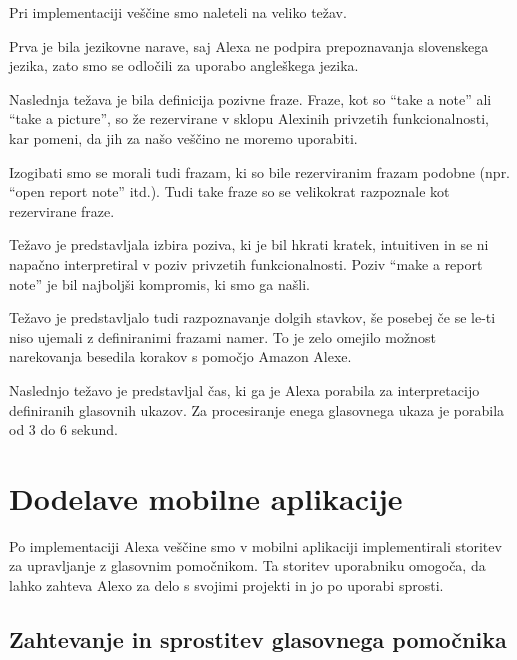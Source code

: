 \documentclass[a4paper, 12pt]{book}
\begin{document}
Pri implementaciji veščine smo naleteli na veliko težav.

Prva je bila jezikovne narave, saj Alexa ne podpira prepoznavanja slovenskega jezika, zato smo se odločili za uporabo angleškega jezika.

Naslednja težava je bila definicija pozivne fraze.
Fraze, kot so \enquote{take a note} ali \enquote{take a picture}, so že rezervirane v sklopu Alexinih privzetih funkcionalnosti, kar pomeni, da jih za našo veščino ne moremo uporabiti.

Izogibati smo se morali tudi frazam, ki so bile rezerviranim frazam podobne (npr. \enquote{open report note} itd.).
Tudi take fraze so se velikokrat razpoznale kot rezervirane fraze.

Težavo je predstavljala izbira poziva, ki je bil hkrati kratek, intuitiven in se ni napačno interpretiral v poziv privzetih funkcionalnosti.
Poziv \enquote{make a report note} je bil najboljši kompromis, ki smo ga našli.

Težavo je predstavljalo tudi razpoznavanje dolgih stavkov, še posebej če se le-ti niso ujemali z definiranimi frazami namer.
To je zelo omejilo možnost narekovanja besedila korakov s pomočjo Amazon Alexe.

Naslednjo težavo je predstavljal čas, ki ga je Alexa porabila za interpretacijo definiranih glasovnih ukazov.
Za procesiranje enega glasovnega ukaza je porabila od 3 do 6 sekund.












\section{Dodelave mobilne aplikacije}

Po implementaciji Alexa veščine smo v mobilni aplikaciji implementirali storitev za upravljanje z glasovnim pomočnikom.
Ta storitev uporabniku omogoča, da lahko zahteva Alexo za delo s svojimi projekti in jo po uporabi sprosti.


\subsection{Zahtevanje in sprostitev glasovnega pomočnika}
\end{document}
